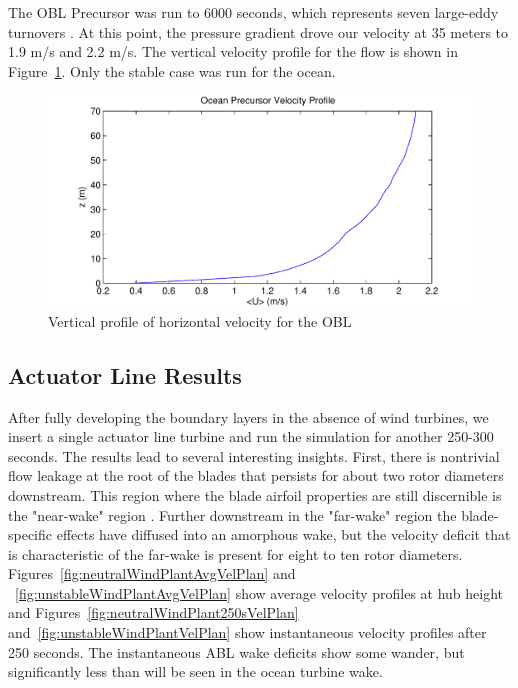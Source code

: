 The OBL Precursor was run to 6000 seconds, which represents seven large-eddy turnovers \cite{churchfield_large-eddy_2012}. At this point, the pressure gradient drove our velocity at 35 meters to 1.9 m/s and 2.2 m/s. The vertical velocity profile for the flow is shown in Figure~\ref{fig:ocean-vertical-speed-profile}. Only the stable case was run for the ocean.

\begin{figure}
\centering
\includegraphics[width=.9\textwidth]{images/ocean-vertical-speed-profile}
\caption{Vertical profile of horizontal velocity for the OBL}
\label{fig:ocean-vertical-speed-profile}
\end{figure}

\subsection{Actuator Line Results}
After fully developing the boundary layers in the absence of wind turbines, we insert a single actuator line turbine and run the simulation for another 250-300 seconds.  The results lead to several interesting insights.  First, there is nontrivial flow leakage at the root of the blades that persists for about two rotor diameters downstream.  This region where the blade airfoil properties are still discernible is the "near-wake" region \cite{sanderse_review_2011}.  Further downstream in the "far-wake" region the blade-specific effects have diffused into an amorphous wake, but the velocity deficit that is characteristic of the far-wake is present for eight to ten rotor diameters.  Figures~\ref{fig:neutralWindPlantAvgVelPlan} and ~\ref{fig:unstableWindPlantAvgVelPlan} show average velocity profiles at hub height and Figures~\ref{fig:neutralWindPlant250sVelPlan} and~\ref{fig:unstableWindPlantVelPlan} show instantaneous velocity profiles after 250 seconds.  The instantaneous ABL wake deficits show some wander, but significantly less than will be seen in the ocean turbine wake.

